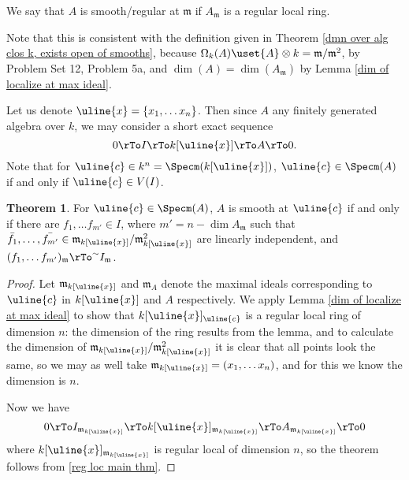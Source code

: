 \documentclass[12 pt]{article}
\theoremstyle{definition}
\newtheorem{theorem}{Theorem}[section]
\begin{document}
\begin{definition} We say that $A$ is smooth/regular at $\mathfrak{m}$ if $A_\mathfrak{m}$ is a regular local ring.
\end{definition}

Note that this is consistent with the definition given in Theorem \ref{dmn over alg clos k, exists open of smooths}, because $\Omega_k(A) \uset{A}\otimes k=\mathfrak{m}/\mathfrak{m}^2$, by Problem Set 12, Problem 5a, and $\dim(A)=\dim(A_\mathfrak{m})$ by Lemma \ref{dim of localize at max ideal}.

Let us denote $\uline{x}=\{x_1, \ldots x_n\}$. Then since $A$ any finitely generated algebra over $k$, we may consider a short exact sequence
\[0 \rTo I \rTo k[\uline{x}] \rTo A \rTo 0.\]
Note that for $\uline{c} \in k^n=\Specm(k[\uline{x}])$, $\uline{c} \in \Specm(A)$ if and only if $\uline{c} \in V(I)$.

\begin{theorem} For $\uline{c} \in \Specm(A)$, $A$ is smooth at $\uline{c}$ if and only if there are $f_1, \ldots f_{m'} \in I$, where $m'=n-\dim{A_\mathfrak{m}}$ such that $\bar{f_1}, \ldots , \bar{f_{m'}} \in \mathfrak{m}_{k[\uline{x}]}/\mathfrak{m}_{k[\uline{x}]}^2$ are linearly independent, and $(f_1, \ldots f_{m'})_\mathfrak{m} \rTo^\sim I_\mathfrak{m}$.
\label{smoothness local coordinates}
\end{theorem}
\begin{proof} Let $\mathfrak{m}_{k[\uline{x}]}$ and $\mathfrak{m}_A$ denote the maximal ideals corresponding to $\uline{c}$ in $k[\uline{x}]$ and $A$ respectively. We apply Lemma \ref{dim of localize at max ideal} to show that $k[\uline{x}]_{\uline{c}}$ is a regular local ring of dimension $n$: the dimension of the ring results from the lemma, and to calculate the dimension of $\mathfrak{m}_{k[\uline{x}]}/\mathfrak{m}_{k[\uline{x}]}^2$ it is clear that all points look the same, so we may as well take $\mathfrak{m}_{k[\uline{x}]}=(x_1, \ldots x_n)$, and for this we know the dimension is $n$.

Now we have
\[0 \rTo I_{\mathfrak{m}_{k[\uline{x}]}} \rTo k[\uline{x}]_{\mathfrak{m}_{k[\uline{x}]}} \rTo A_{\mathfrak{m}_{k[\uline{x}]}} \rTo 0\]
where $k[\uline{x}]_{\mathfrak{m}_{k[\uline{x}]}}$ is regular local of dimension $n$, so the theorem follows from \ref{reg loc main thm}.
\end{proof}
\end{document}
